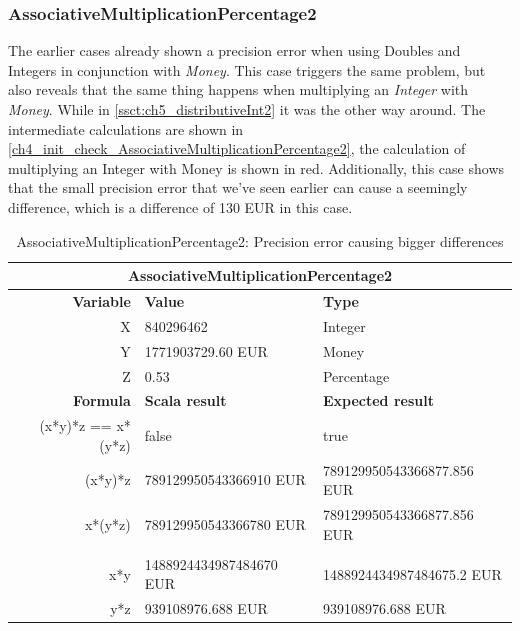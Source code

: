\subsubsection{AssociativeMultiplicationPercentage2}
The earlier cases already shown a precision error when using Doubles and Integers in conjunction with \textit{Money}. This case triggers the same problem, but also reveals that the same thing happens when multiplying an \textit{Integer} with \textit{Money}. While in \autoref{ssct:ch5_distributiveInt2} it was the other way around. The intermediate calculations are shown in \autoref{ch4_init_check_AssociativeMultiplicationPercentage2}, the calculation of multiplying an Integer with Money is shown in red. Additionally, this case shows that the small precision error that we've seen earlier can cause a seemingly difference, which is a difference of 130 EUR in this case.
\\
\begin{table}[h!]
\centering
\begin{tabular}{rll}
\hline
\multicolumn{3}{c}{\textbf{AssociativeMultiplicationPercentage2}}                \\ \hline
\textbf{Variable}           & \textbf{Value}                   & \textbf{Type}                       \\ \hline
X                  & 840296462               & Integer                    \\
Y                  & 1771903729.60 EUR       & Money                      \\
Z                  & 0.53                    & Percentage                 \\ \hline
\textbf{Formula}            & \textbf{Scala result}            & \textbf{Expected result}            \\ \hline
(x*y)*z == x*(y*z) & false                   & true                       \\
(x*y)*z            & 789129950543366910 EUR  & 789129950543366877.856 EUR \\
x*(y*z)            & 789129950543366780 EUR  & 789129950543366877.856 EUR \\
                   &                         &                            \\
x*y                & 1488924434987484670 EUR & 1488924434987484675.2 EUR  \\
y*z                & 939108976.688 EUR       & 939108976.688 EUR          \\ \hline
\end{tabular}
\caption{AssociativeMultiplicationPercentage2: Precision error causing bigger differences}
\label{ch4_init_check_AssociativeMultiplicationPercentage2}
\end{table}
\\

